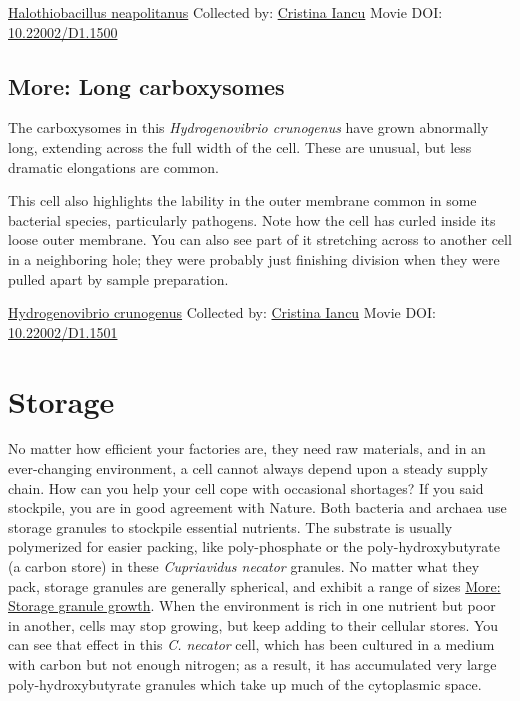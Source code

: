 \documentclass[]{tufte-book}
\begin{document}
\hypertarget{htmlwidget-51e755ef4c608bccafba}{}

\label{fig:4-7a}\protect\hyperlink{tree}{Halothiobacillus neapolitanus} Collected by: \protect\hyperlink{cristina_iancu}{Cristina Iancu} Movie DOI: \href{https://doi.org/10.22002/D1.1500}{10.22002/D1.1500}

\hypertarget{Long_carboxysomes}{%
\subsection*{More: Long carboxysomes}\label{Long_carboxysomes}}

The carboxysomes in this \emph{Hydrogenovibrio crunogenus} have grown abnormally long, extending across the full width of the cell. These are unusual, but less dramatic elongations are common.

This cell also highlights the lability in the outer membrane common in some bacterial species, particularly pathogens. Note how the cell has curled inside its loose outer membrane. You can also see part of it stretching across to another cell in a neighboring hole; they were probably just finishing division when they were pulled apart by sample preparation.



\hypertarget{htmlwidget-452bfde1e7f6ea2518b1}{}

\label{fig:4-7b}\protect\hyperlink{tree}{Hydrogenovibrio crunogenus} Collected by: \protect\hyperlink{cristina_iancu}{Cristina Iancu} Movie DOI: \href{https://doi.org/10.22002/D1.1501}{10.22002/D1.1501}

\hypertarget{storage}{%
\section{Storage}\label{storage}}

No matter how efficient your factories are, they need raw materials, and in an ever-changing environment, a cell cannot always depend upon a steady supply chain. How can you help your cell cope with occasional shortages? If you said stockpile, you are in good agreement with Nature. Both bacteria and archaea use storage granules to stockpile essential nutrients. The substrate is usually polymerized for easier packing, like poly-phosphate or the poly-hydroxybutyrate (a carbon store) in these \emph{Cupriavidus necator} granules. No matter what they pack, storage granules are generally spherical, and exhibit a range of sizes \protect\hyperlink{Storage_granule_growth}{More: Storage granule growth}. When the environment is rich in one nutrient but poor in another, cells may stop growing, but keep adding to their cellular stores. You can see that effect in this \emph{C. necator} cell, which has been cultured in a medium with carbon but not enough nitrogen; as a result, it has accumulated very large poly-hydroxybutyrate granules which take up much of the cytoplasmic space.
\end{document}
